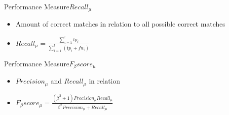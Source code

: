 \begin{frame}{Performance Measure}{$Recall_{\mu}$}
    \begin{center}
        \begin{itemize}
            \item Amount of correct matches in relation to all possible correct matches
            
            \item $Recall_{\mu} = \frac{\sum \limits_{i=1}^{l} tp_i}{\sum \limits_{i=1}^{l} (tp_i + fn_i)}$
        \end{itemize}
    \end{center}
\end{frame}

\begin{frame}{Performance Measure}{$F_{\beta}score_{\mu}$}
    \begin{center}
        \begin{itemize}
            \item $Precision_{\mu}$ and $Recall_{\mu}$ in relation
            
            \item $F_{\beta}score_{\mu} = \frac{(\beta^2 + 1)Precision_{\mu} Recall_{\mu}}{\beta^2 Precision_{\mu} + Recall_{\mu}}$
        \end{itemize}
    \end{center}
\end{frame}
